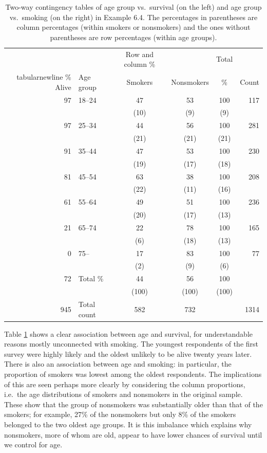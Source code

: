 \documentclass[11pt,a4paper,openany]{book}
\begin{document}
\begin{longtable}[]{@{}rlcccr@{}}
\caption{\label{tab:t-whickham3} Two-way contingency tables of age group
vs.~survival (on the left) and age group vs.~smoking (on the right) in
Example 6.4. The percentages in parentheses are column percentages
(within smokers or nonsmokers) and the ones without parentheses are row
percentages (within age groups).}\tabularnewline
\toprule
\ & \ & Row and column \% & \ & Total & \\tabularnewline
\% Alive & Age group & Smokers & Nonsmokers & \% & Count\tabularnewline
97 & 18--24 & 47 & 53 & 100 & 117\tabularnewline
& & (10) & (9) & (9) &\tabularnewline
97 & 25--34 & 44 & 56 & 100 & 281\tabularnewline
& & (21) & (21) & (21) &\tabularnewline
91 & 35--44 & 47 & 53 & 100 & 230\tabularnewline
& & (19) & (17) & (18) &\tabularnewline
81 & 45--54 & 63 & 38 & 100 & 208\tabularnewline
& & (22) & (11) & (16) &\tabularnewline
61 & 55--64 & 49 & 51 & 100 & 236\tabularnewline
& & (20) & (17) & (13) &\tabularnewline
21 & 65--74 & 22 & 78 & 100 & 165\tabularnewline
& & (6) & (18) & (13) &\tabularnewline
0 & 75-- & 17 & 83 & 100 & 77\tabularnewline
& & (2) & (9) & (6) &\tabularnewline
72 & Total \% & 44 & 56 & 100 &\tabularnewline
& & (100) & (100) & (100) &\tabularnewline
945 & Total count & 582 & 732 & & 1314\tabularnewline
\bottomrule
\end{longtable}

Table \ref{tab:t-whickham3} shows a clear association between age and
survival, for understandable reasons mostly unconnected with smoking.
The youngest respondents of the first survey were highly likely and the
oldest unlikely to be alive twenty years later. There is also an
association between age and smoking: in particular, the proportion of
smokers was lowest among the oldest respondents. The implications of
this are seen perhaps more clearly by considering the column
proportions, i.e.~the age distributions of smokers and nonsmokers in the
original sample. These show that the group of nonsmokers was
substantially older than that of the smokers; for example, 27\% of the
nonsmokers but only 8\% of the smokers belonged to the two oldest age
groups. It is this imbalance which explains why nonsmokers, more of whom
are old, appear to have lower chances of survival until we control for
age.
\end{document}
